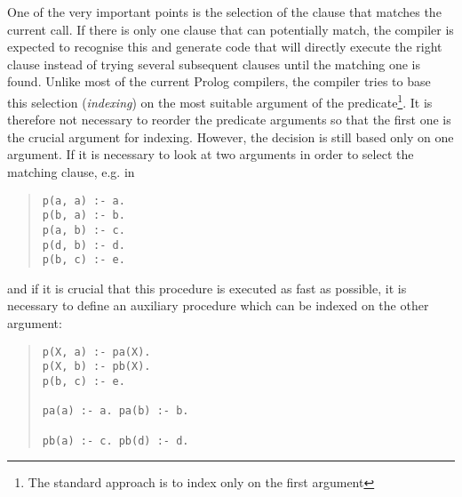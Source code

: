 One of the very important points is the selection
of the clause that matches the current call.
If there is only one clause that can potentially match,
the compiler is expected to recognise this and generate code
that will directly execute the right clause
instead of trying several subsequent clauses until the
matching one is found.
Unlike most of the current Prolog compilers, the {\eclipse}
compiler tries to base this selection ({\it indexing}) on the most suitable
argument of the predicate\footnote{The standard approach
is to index only on the first argument}.
It is therefore not necessary to reorder the predicate
arguments so that the first one is the crucial argument
for indexing.
However, the decision is still based only on one argument.
If it is necessary to look at two arguments
in order to select the matching clause, e.g. in
\begin{quote}
\begin{verbatim}
p(a, a) :- a.
p(b, a) :- b.
p(a, b) :- c.
p(d, b) :- d.
p(b, c) :- e.
\end{verbatim}
\end{quote}
and if it is crucial that this procedure is executed
as fast as possible, it is necessary to define
an auxiliary procedure which can be indexed on the other argument:
\begin{quote}
\begin{verbatim}
p(X, a) :- pa(X).
p(X, b) :- pb(X).
p(b, c) :- e.

pa(a) :- a. pa(b) :- b.

pb(a) :- c. pb(d) :- d.
\end{verbatim}
\end{quote}

